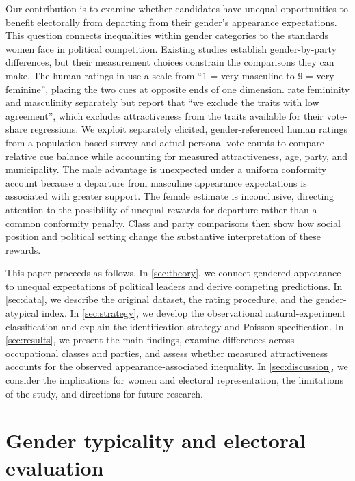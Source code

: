 \documentclass[11pt,a4paper]{article}\usepackage[]{graphicx}\usepackage[]{xcolor}
\begin{document}
Our contribution is to examine whether candidates have unequal opportunities to benefit electorally from departing from their gender's appearance expectations. This question connects inequalities within gender categories to the standards women face in political competition. Existing studies establish gender-by-party differences, but their measurement choices constrain the comparisons they can make. The human ratings in \textcite[26]{Carpinella2016} use a scale from ``1 = very masculine to 9 = very feminine'', placing the two cues at opposite ends of one dimension. \textcite[6,11--12]{Park2023} rate femininity and masculinity separately but report that ``we exclude the traits with low agreement'', which excludes attractiveness from the traits available for their vote-share regressions. We exploit separately elicited, gender-referenced human ratings from a population-based survey and actual personal-vote counts to compare relative cue balance while accounting for measured attractiveness, age, party, and municipality. The male advantage is unexpected under a uniform conformity account because a departure from masculine appearance expectations is associated with greater support. The female estimate is inconclusive, directing attention to the possibility of unequal rewards for departure rather than a common conformity penalty. Class and party comparisons then show how social position and political setting change the substantive interpretation of these rewards.

This paper proceeds as follows. In \autoref{sec:theory}, we connect gendered appearance to unequal expectations of political leaders and derive competing predictions. In \autoref{sec:data}, we describe the original dataset, the rating procedure, and the gender-atypical index. In \autoref{sec:strategy}, we develop the observational natural-experiment classification and explain the identification strategy and Poisson specification. In \autoref{sec:results}, we present the main findings, examine differences across occupational classes and parties, and assess whether measured attractiveness accounts for the observed appearance-associated inequality. In \autoref{sec:discussion}, we consider the implications for women and electoral representation, the limitations of the study, and directions for future research.

\section{Gender typicality and electoral evaluation}
\label{sec:theory}
\end{document}
